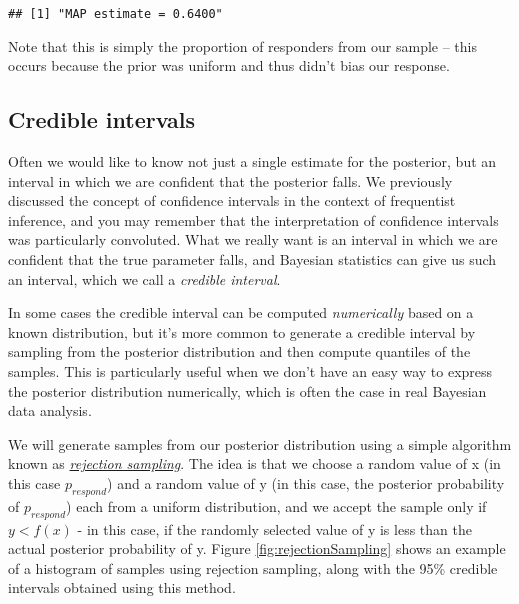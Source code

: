 \documentclass[]{book}
\newenvironment{Shaded}{\begin{snugshade}}{\end{snugshade}}
\newcommand{\KeywordTok}[1]{\textcolor[rgb]{0.13,0.29,0.53}{\textbf{#1}}}
\newcommand{\StringTok}[1]{\textcolor[rgb]{0.31,0.60,0.02}{#1}}
\newcommand{\CommentTok}[1]{\textcolor[rgb]{0.56,0.35,0.01}{\textit{#1}}}
\newcommand{\OperatorTok}[1]{\textcolor[rgb]{0.81,0.36,0.00}{\textbf{#1}}}
\newcommand{\NormalTok}[1]{#1}
\theoremstyle{definition}
\theoremstyle{definition}
\theoremstyle{definition}
\theoremstyle{remark}
\begin{document}
\begin{Shaded}
\end{Shaded}

\begin{verbatim}
## [1] "MAP estimate = 0.6400"
\end{verbatim}

Note that this is simply the proportion of responders from our sample --
this occurs because the prior was uniform and thus didn't bias our
response.

\subsection{Credible intervals}\label{credible-intervals}

Often we would like to know not just a single estimate for the
posterior, but an interval in which we are confident that the posterior
falls. We previously discussed the concept of confidence intervals in
the context of frequentist inference, and you may remember that the
interpretation of confidence intervals was particularly convoluted. What
we really want is an interval in which we are confident that the true
parameter falls, and Bayesian statistics can give us such an interval,
which we call a \emph{credible interval}.

In some cases the credible interval can be computed \emph{numerically}
based on a known distribution, but it's more common to generate a
credible interval by sampling from the posterior distribution and then
compute quantiles of the samples. This is particularly useful when we
don't have an easy way to express the posterior distribution
numerically, which is often the case in real Bayesian data analysis.

We will generate samples from our posterior distribution using a simple
algorithm known as
\href{https://am207.github.io/2017/wiki/rejectionsampling.html}{\emph{rejection
sampling}}. The idea is that we choose a random value of x (in this case
\(p_{respond}\)) and a random value of y (in this case, the posterior
probability of \(p_{respond}\)) each from a uniform distribution, and we
accept the sample only if \(y < f(x)\) - in this case, if the randomly
selected value of y is less than the actual posterior probability of y.
Figure \ref{fig:rejectionSampling} shows an example of a histogram of
samples using rejection sampling, along with the 95\% credible intervals
obtained using this method.
\end{document}
